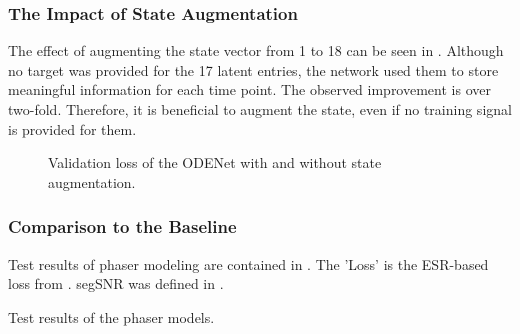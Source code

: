 \subsubsection{The Impact of State Augmentation}
The effect of augmenting the state vector from 1 to 18 can be seen in . Although no target was provided for the 17 latent entries, the network used them to store meaningful information for each time point. The observed improvement is over two-fold. Therefore, it is beneficial to augment the state, even if no training signal is provided for them.

\begin{figure}
    \centering
    
    \caption{Validation loss of the ODENet with and without state augmentation.}
    \label{fig:state_augmentation}
\end{figure}

\subsubsection{Comparison to the Baseline}

Test results of phaser modeling are contained in . The 'Loss' is the \ac{ESR}-based loss from . \ac{segSNR} was defined in .

\begin{table}[]
    \caption{Test results of the phaser models.}
    \centering
    
    \label{tab:phaser_results}
\end{table}

